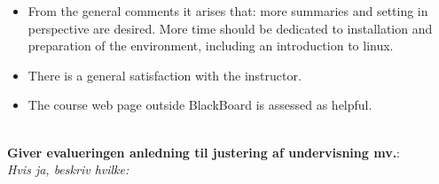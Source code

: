 \documentclass[11pt]{article}
\begin{document}
\begin{itemize}
\item From the general comments it arises that: more summaries and
  setting in perspective are desired.  More time should be dedicated to
  installation and preparation of the environment, including an
  introduction to linux.

\item There is a general satisfaction with the instructor.

\item The course web page outside BlackBoard is assessed as helpful.

\end{itemize}

  
~\\[1cm]\textcolor{sdublue}{{\bf Giver evalueringen anledning til justering af undervisning mv.}:\\
{\small \em Hvis ja, beskriv hvilke:}}
\end{document}
